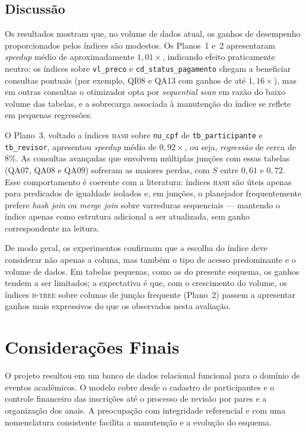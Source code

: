 \documentclass[12pt,a4paper]{article}
\begin{document}


\subsection{Discussão}
\label{subsec:discussao}
Os resultados mostram que, no volume de dados atual, os ganhos de desempenho
proporcionados pelos índices são modestos. Os Planos~1 e~2 apresentaram
\emph{speedup} médio de aproximadamente $1{,}01\times$, indicando efeito
praticamente neutro: os índices sobre \texttt{vl\_preco} e \texttt{cd\_status\_pagamento}
chegam a beneficiar consultas pontuais (por exemplo, QI08 e QA13 com ganhos de
até $1{,}16\times$), mas em outras consultas o otimizador opta por
\emph{sequential scan} em razão do baixo volume das tabelas, e a sobrecarga
associada à manutenção do índice se reflete em pequenas regressões.

O Plano~3, voltado a índices \textsc{hash} sobre \texttt{nu\_cpf} de
\texttt{tb\_participante} e \texttt{tb\_revisor}, apresentou \emph{speedup} médio
de $0{,}92\times$, ou seja, \emph{regressão} de cerca de 8\%. As consultas
avançadas que envolvem múltiplas junções com essas tabelas (QA07, QA08 e QA09)
sofreram as maiores perdas, com $S$ entre $0{,}61$ e $0{,}72$. Esse comportamento
é coerente com a literatura: índices \textsc{hash} são úteis apenas para
predicados de igualdade isolados e, em junções, o planejador frequentemente
prefere \emph{hash join} ou \emph{merge join} sobre varreduras sequenciais ---
mantendo o índice apenas como estrutura adicional a ser atualizada, sem ganho
correspondente na leitura.

De modo geral, os experimentos confirmam que a escolha do índice deve considerar
não apenas a coluna, mas também o tipo de acesso predominante e o volume de
dados. Em tabelas pequenas, como as do presente esquema, os ganhos tendem a ser
limitados; a expectativa é que, com o crescimento do volume, os índices
\textsc{b-tree} sobre colunas de junção frequente (Plano~2) passem a apresentar
ganhos mais expressivos do que os observados nesta avaliação.

\section{Considerações Finais}
\label{sec:conclusao}

O projeto resultou em um banco de dados relacional funcional para o domínio de eventos acadêmicos. O modelo cobre desde o cadastro de participantes e o controle financeiro das inscrições até o processo de revisão por pares e a organização dos anais. A preocupação com integridade referencial e com uma nomenclatura consistente facilita a manutenção e a evolução do esquema.
\end{document}

